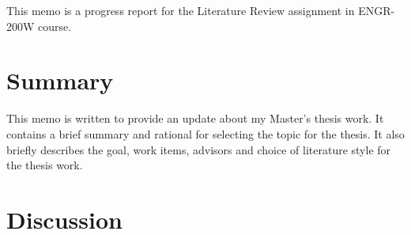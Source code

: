 \documentclass[letterpaper,12pt]{texMemo}
\begin{document}
\maketitle

\noindent This memo is a progress report for the Literature Review assignment in ENGR-200W course.


\section*{Summary}
%
This memo is written to provide an update about my Master's thesis work. It contains a brief summary and rational for selecting the topic for the thesis. It also briefly describes the goal, work items, advisors and choice of literature style for the thesis work.

\section*{Discussion}
%
%
%
\end{document}
